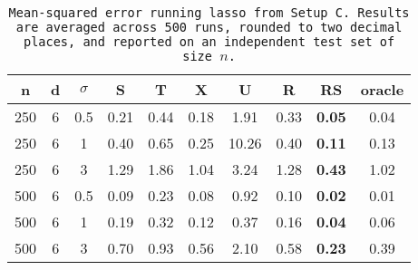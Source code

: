 \begin{table}[ht]
\centering
\begin{tabular}{cccccccccc}
  \hline
n & d & $\sigma$ & S & T & X & U & R & RS & oracle \\ 
  \hline
250 & 6 & 0.5 & 0.21 &  0.44 & 0.18 &  1.91 & 0.33 & \bf 0.05 & 0.04 \\ 
  250 & 6 & 1 & 0.40 &  0.65 & 0.25 & 10.26 & 0.40 & \bf 0.11 & 0.13 \\ 
  250 & 6 & 3 & 1.29 &  1.86 & 1.04 &  3.24 & 1.28 & \bf 0.43 & 1.02 \\ 
  500 & 6 & 0.5 & 0.09 &  0.23 & 0.08 &  0.92 & 0.10 & \bf 0.02 & 0.01 \\ 
  500 & 6 & 1 & 0.19 &  0.32 & 0.12 &  0.37 & 0.16 & \bf 0.04 & 0.06 \\ 
  500 & 6 & 3 & 0.70 &  0.93 & 0.56 &  2.10 & 0.58 & \bf 0.23 & 0.39 \\ 
   \hline
\end{tabular}
\caption{\tt Mean-squared error running \texttt{lasso} from Setup C. Results are averaged across 500 runs, rounded to two decimal places, and reported on an independent test set of size $n$.} 
\label{table:setup3}
\end{table}
